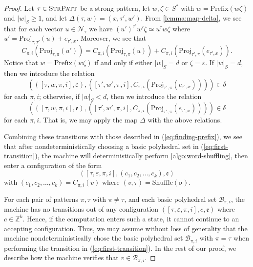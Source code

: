 \begin{proof}
Let $\tau \in \textsc{StrPatt}$ be a strong pattern, let $w,\zeta \in S^*$ with $w = \mathrm{Prefix}(w\zeta)$ and $|w|_S \geqslant 1$, and let $\Delta(\tau,w) = (x,\tau',w')$.
From \cref{lemma:map-delta}, we see that for each vector $u \in \mathcal{N}_\tau$ we have $(u')^{\tau'}w'\zeta \simeq u^\tau w \zeta$ where $u' = \mathrm{Proj}_{\tau,\tau'}(u)+e_{\tau',x}$.
Moreover, we see that
\[
	C_{\pi,i}(\mathrm{Proj}_{\tau,\pi}(u')) =
		C_{\pi,i}(\mathrm{Proj}_{\tau,\pi}(u)) +
		C_{\pi,i}(\mathrm{Proj}_{\tau',\pi}(e_{\tau',x})).
\]
Notice that $w = \mathrm{Prefix}(w\zeta)$ if and only if either $|w|_S = d$ or $\zeta = \varepsilon$.
If $|w|_S = d$, then we introduce the relation
\[
	(([\tau,w,\pi,i],\varepsilon),([\tau',w',\pi,i],C_{\pi,i}(\mathrm{Proj}_{\tau',\pi}(e_{\tau',x})))) \in \delta
\]
for each $\pi,i$;
otherwise, if $|w|_S < d$, then we introduce the relation
\[
	(([\tau,w,\pi,i],\mathfrak{e}),([\tau',w',\pi,i],C_{\pi,i}(\mathrm{Proj}_{\tau',\pi}(e_{\tau',x})))) \in \delta
\]
for each $\pi,i$.
That is, we may apply the map $\Delta$ with the above relations.

Combining these transitions with those described in (\ref{eq:finding-prefix}), we see that after nondeterministically choosing a basic polyhedral set in (\ref{eq:first-transition}), the machine will deterministically perform \cref{algo:word-shuffling}, then enter a configuration of the form
\begin{equation}\label{eq:after-word-shuffle}
	(
		[\tau,\varepsilon,\pi,i],(c_1, c_2,\ldots,c_k), \mathfrak{e}
	)
\end{equation}
with $(c_1,c_2,\ldots, c_k) = C_{\pi,i}(v)$ where $(v,\tau) = \mathrm{Shuffle}(\sigma)$.

For each pair of patterns $\pi,\tau$ with $\pi \neq \tau$, and each basic polyhedral set $\mathcal{B}_{\pi,i}$, the machine has no transitions out of any configuration $([\tau,\varepsilon,\pi,i],c,\mathfrak{e})$ where $c \in \mathbb{Z}^k$.
Hence, if the computation enters such a state, it cannot continue to an accepting configuration.
Thus, we may assume without loss of generality that the machine nondeterministically chose the basic polyhedral set $\mathcal{B}_{\pi,i}$ with $\pi = \tau$ when performing the transition in (\ref{eq:first-transition}).
In the rest of our proof, we describe how the machine verifies that $v \in \mathcal{B}_{\pi,i}$.



\end{proof}
